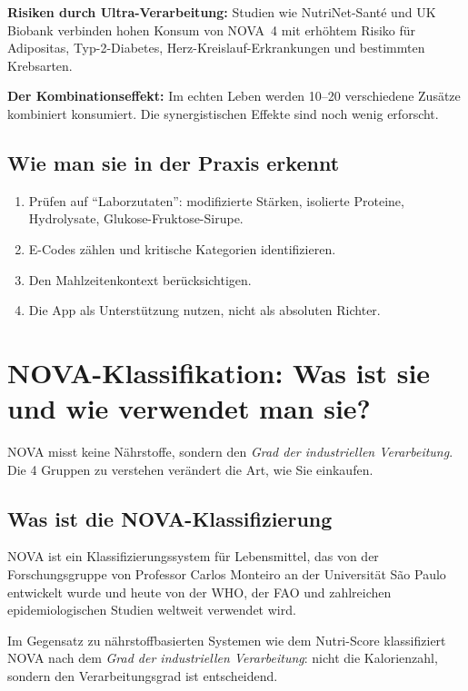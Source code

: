 \documentclass[a5paper,12pt,oneside,openany]{book}
\begin{document}
\textbf{Risiken durch Ultra-Verarbeitung:} Studien wie NutriNet-Sant\'{e} und
UK Biobank verbinden hohen Konsum von NOVA~4 mit erh\"{o}htem Risiko f\"{u}r
Adipositas, Typ-2-Diabetes, Herz-Kreislauf-Erkrankungen und bestimmten
Krebsarten.

\textbf{Der Kombinationseffekt:} Im echten Leben werden 10--20 verschiedene
Zus\"{a}tze kombiniert konsumiert. Die synergistischen Effekte sind noch
wenig erforscht.

\section{Wie man sie in der Praxis erkennt}

\begin{enumerate}
  \item Pr\"{u}fen auf ``Laborzutaten'': modifizierte St\"{a}rken, isolierte
    Proteine, Hydrolysate, Glukose-Fruktose-Sirupe.
  \item E-Codes z\"{a}hlen und kritische Kategorien identifizieren.
  \item Den Mahlzeitenkontext ber\"{u}cksichtigen.
  \item Die App als Unterst\"{u}tzung nutzen, nicht als absoluten Richter.
\end{enumerate}

\chapter{NOVA-Klassifikation: Was ist sie und wie verwendet man sie?}

NOVA misst keine N\"{a}hrstoffe, sondern den \emph{Grad der industriellen
Verarbeitung}. Die 4 Gruppen zu verstehen ver\"{a}ndert die Art, wie Sie
einkaufen.

\section{Was ist die NOVA-Klassifizierung}

NOVA ist ein Klassifizierungssystem f\"{u}r Lebensmittel, das von der
Forschungsgruppe von Professor Carlos Monteiro an der Universit\"{a}t S\~{a}o
Paulo entwickelt wurde und heute von der WHO, der FAO und zahlreichen
epidemiologischen Studien weltweit verwendet wird.

Im Gegensatz zu n\"{a}hrstoffbasierten Systemen wie dem Nutri-Score
klassifiziert NOVA nach dem \emph{Grad der industriellen Verarbeitung}:
nicht die Kalorienzahl, sondern den Verarbeitungsgrad ist entscheidend.
\end{document}
